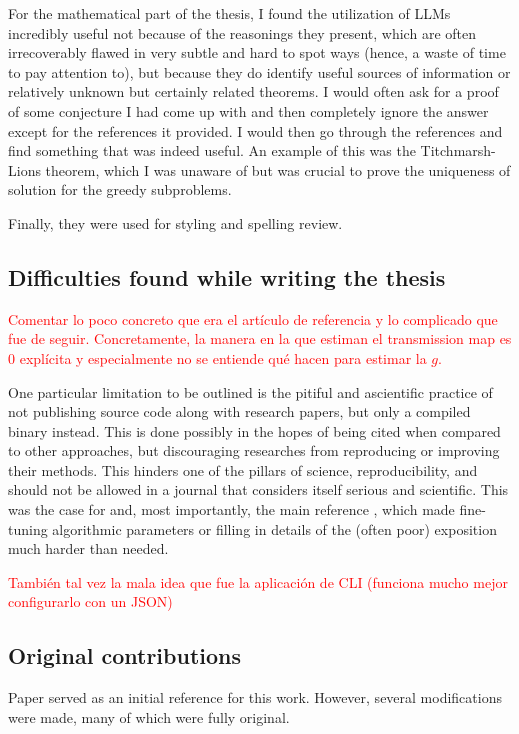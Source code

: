 \documentclass[twocolumn,twoside,a4paper,10pt]{IEEEtran}
\newcommand{\Frank}[1]{\textcolor{red}{#1}}
\begin{document}
For the mathematical part of the thesis, I found the utilization of LLMs
incredibly useful not because of the reasonings they present, which are often
irrecoverably flawed in very subtle and hard to spot ways (hence, a waste of
time to pay attention to), but because they do
identify useful sources of information or relatively unknown but certainly related theorems. I would often ask for a proof of some conjecture I had come up with and then completely ignore the answer except for the references it provided. I would then go through the references and find something that was indeed useful. An example of this was the Titchmarsh-Lions theorem, which I was unaware of but was crucial to prove the uniqueness of solution for the greedy subproblems.

Finally, they were used for styling and spelling review.

\subsection{Difficulties found while writing the thesis}
\Frank{
Comentar lo poco concreto que era el artículo de referencia y lo complicado que fue de seguir. Concretamente, la manera en la que estiman el transmission map es 0 explícita y especialmente no se entiende qué hacen para estimar la \(g\).
}

One particular limitation to be outlined is the pitiful and ascientific practice of not publishing
source code along with research papers, but only a compiled binary instead. This is done
possibly in the hopes of being cited when compared to other approaches, but discouraging researches from reproducing or improving their methods. This hinders
one of the pillars of science, reproducibility, and should not be allowed in
a journal that considers itself serious and scientific. This was the case for \cite{7574330} and, most importantly, the main reference \cite{xie2021variational}, which made fine-tuning algorithmic parameters or
filling in details of the (often poor) exposition much harder than needed.

\Frank{También tal vez la mala idea que fue la aplicación de CLI (funciona mucho mejor configurarlo con un JSON)}
\subsection{Original contributions}
Paper \cite{xie2021variational} served as an initial reference for this work. However, several modifications were made, many of which were fully original.
\end{document}
